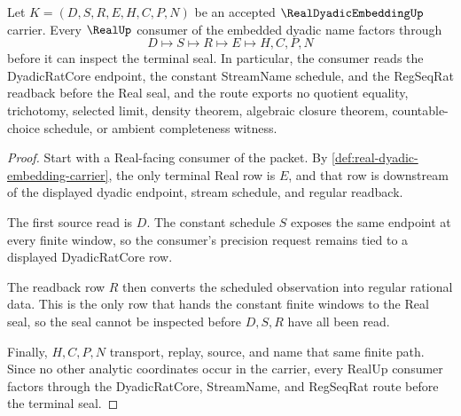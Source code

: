 \begin{theorem}
\label{thm:real-dyadic-embedding-regseq-handoff}
Let $K=(D,S,R,E,H,C,P,N)$ be an accepted $\RealDyadicEmbeddingUp$ carrier. Every $\RealUp$ consumer of the embedded dyadic name factors through
$$
D\longmapsto S\longmapsto R\longmapsto E\longmapsto H,C,P,N
$$
before it can inspect the terminal seal. In particular, the consumer reads the DyadicRatCore endpoint, the constant StreamName schedule, and the RegSeqRat readback before the Real seal, and the route exports no quotient equality, trichotomy, selected limit, density theorem, algebraic closure theorem, countable-choice schedule, or ambient completeness witness.
\end{theorem}
\begin{proof}
Start with a Real-facing consumer of the packet. By \autoref{def:real-dyadic-embedding-carrier}, the only terminal Real row is $E$, and that row is downstream of the displayed dyadic endpoint, stream schedule, and regular readback.

The first source read is $D$. The constant schedule $S$ exposes the same endpoint at every finite window, so the consumer's precision request remains tied to a displayed DyadicRatCore row.

The readback row $R$ then converts the scheduled observation into regular rational data. This is the only row that hands the constant finite windows to the Real seal, so the seal cannot be inspected before $D,S,R$ have all been read.

Finally, $H,C,P,N$ transport, replay, source, and name that same finite path. Since no other analytic coordinates occur in the carrier, every RealUp consumer factors through the DyadicRatCore, StreamName, and RegSeqRat route before the terminal seal.
\end{proof}

\begin{closurestatus}{\RealDyadicEmbeddingUp}
  \theoryclosure{\seedClosure}
  \formalstatus{\unformalizedV}
\end{closurestatus}
